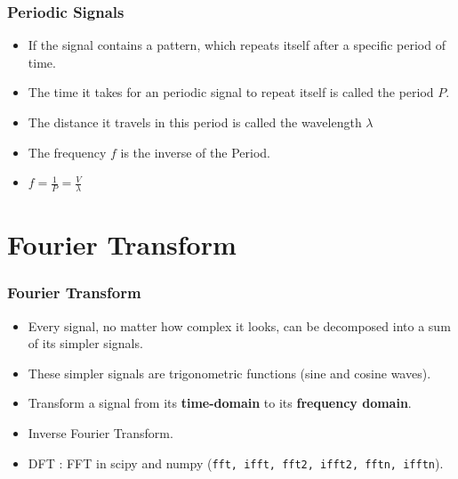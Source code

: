 \documentclass{beamer}
\begin{document}
	\begin{frame}
		\frametitle{Periodic Signals}
		
		\begin{itemize}
			\item
			If the signal contains a pattern, which repeats itself after a specific period of time.
			
			\item
			The time it takes for an periodic signal to repeat itself is called the period $P$.
			
			\item
			The distance it travels in this period is called the wavelength $\lambda$
			
			\item
			The frequency $f$ is the inverse of the Period.
			
			\item
			$f = \frac{1}{P} = \frac{V}{\lambda}$
			
			
		\end{itemize}
		
		
	\end{frame}

	\section{Fourier Transform}
	
	\begin{frame}
		\frametitle{Fourier Transform}
		
		\begin{itemize}
			\item
			
			Every signal, no matter how complex it looks, can be decomposed into a sum of its simpler signals.
			
			\item
			These simpler signals are trigonometric functions (sine and cosine waves).
			
			\item
			
			Transform a signal from its \textbf{time-domain} to its \textbf{frequency domain}.
			
			\item
			
			Inverse Fourier Transform.
			
			\item
			DFT : FFT in scipy and numpy (\lstinline|fft, ifft, fft2, ifft2, fftn, ifftn|).
			
		\end{itemize}
		
	\end{frame}
\end{document}

